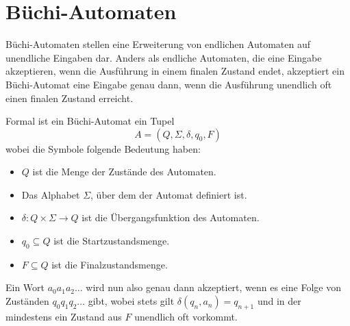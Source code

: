 \section{Büchi-Automaten}
Büchi-Automaten stellen eine Erweiterung von endlichen Automaten auf unendliche Eingaben dar\cite{buchibasics}.
Anders als endliche Automaten, die eine Eingabe akzeptieren, wenn die Ausführung in einem finalen Zustand endet, akzeptiert ein Büchi-Automat eine Eingabe genau dann, wenn die Ausführung unendlich oft einen finalen Zustand erreicht.

Formal ist ein Büchi-Automat ein Tupel
\[ A = (Q,\Sigma,\delta,q_0,F) \]
wobei die Symbole folgende Bedeutung haben:
\begin{itemize}
  \item $Q$ ist die Menge der Zustände des Automaten.
  \item Das Alphabet $\Sigma$, über dem der Automat definiert ist.
  \item $\delta : Q\times\Sigma\rightarrow Q$ ist die Übergangsfunktion des Automaten.
  \item $q_0\subseteq Q$ ist die Startzustandsmenge.
  \item $F\subseteq Q$ ist die Finalzustandsmenge.
\end{itemize}
Ein Wort $a_0a_1a_2\dots$ wird nun also genau dann akzeptiert, wenn es eine Folge von Zuständen $q_0q_1q_2\dots$ gibt, wobei stets gilt $\delta(q_n,a_n)=q_{n+1}$ und in der mindestens ein Zustand aus $F$ unendlich oft vorkommt.